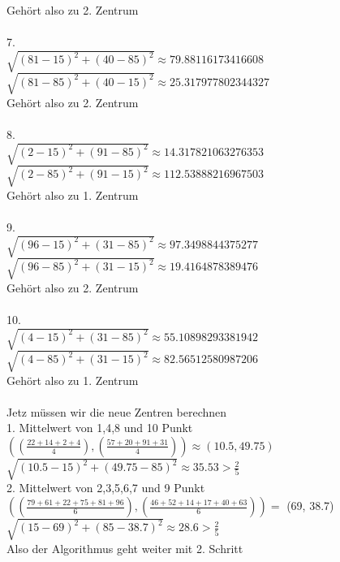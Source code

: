 \begin{enumerate}
Gehört also zu 2. Zentrum \\ \\
7. \\ 
$\sqrt{(81-15)^2 + (40-85)^2} \approx 79.88116173416608$ \\ 
$\sqrt{(81-85)^2 + (40-15)^2} \approx 25.317977802344327$ \\ 
Gehört also zu 2. Zentrum \\ \\
8. \\ 
$\sqrt{(2-15)^2 + (91-85)^2} \approx 14.317821063276353$ \\ 
$\sqrt{(2-85)^2 + (91-15)^2} \approx 112.53888216967503$ \\ 
Gehört also zu 1. Zentrum \\ \\
9. \\ 
$\sqrt{(96-15)^2 + (31-85)^2} \approx 97.3498844375277$ \\ 
$\sqrt{(96-85)^2 + (31-15)^2} \approx 19.4164878389476$ \\ 
Gehört also zu 2. Zentrum \\ \\
10. \\ 
$\sqrt{(4-15)^2 + (31-85)^2} \approx 55.10898293381942$ \\ 
$\sqrt{(4-85)^2 + (31-15)^2} \approx 82.56512580987206$ \\ 
Gehört also zu 1. Zentrum \\ \\

Jetz müssen wir die neue Zentren berechnen \\
1. Mittelwert von 1,4,8 und 10 Punkt
$((\frac{22+14+2+4}{4}),(\frac{57+20+91+31}{4})) \approx (10.5, 49.75) $ \\
$\sqrt{(10.5-15)^2 + (49.75-85)^2} \approx 35.53  > \frac{2}{5}$ \\

2. Mittelwert von 2,3,5,6,7 und 9 Punkt \\
$((\frac{79+61+22+75+81+96}{6}), (\frac{46+52+14+17+40+63}{6})) =$ (69, 38.7) \\
$\sqrt{(15-69)^2 + (85-38.7)^2} \approx 28.6  > \frac{2}{5}$ \\

Also der Algorithmus geht weiter mit 2. Schritt


\end{enumerate}
